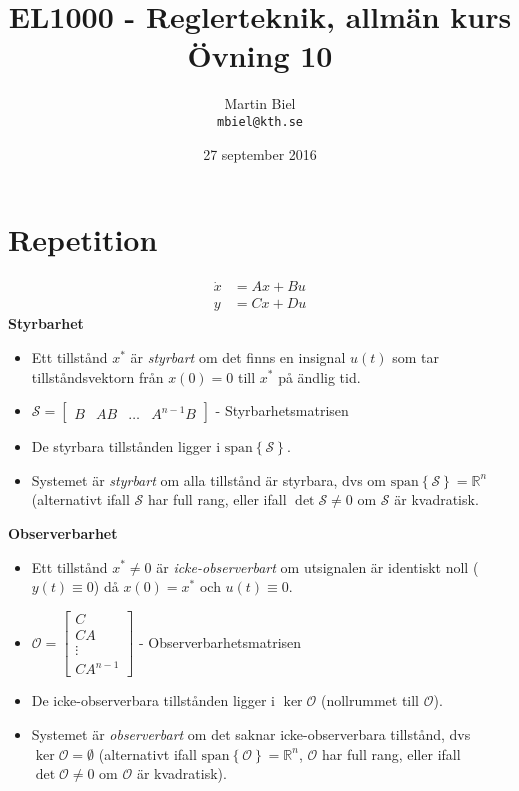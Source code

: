 \documentclass[12pt]{article}
\newcommand{\sspan}[1]{\mathrm{span}\left\{#1\right\}}
\begin{document}
\begin{titlepage}
\author{Martin Biel \\ \texttt{mbiel@kth.se}}
\title{EL1000 - Reglerteknik, allmän kurs \\ \Large Övning 10}
\date{27 september 2016}
\end{titlepage}

\maketitle

\section*{Repetition}
\begin{align*}
  \dot{x} &= Ax + Bu \\
  y &= Cx + Du
\end{align*}
\textbf{Styrbarhet} \\
\begin{itemize}
\item Ett tillstånd $x^*$ är \emph{styrbart} om det finns en insignal $u(t)$ som tar tillståndsvektorn från $x(0) = 0$ till $x^*$ på ändlig tid.
\item $\mathcal{S} =
  \begin{bmatrix}
    B & AB & \dots & A^{n-1}B
  \end{bmatrix}$ - Styrbarhetsmatrisen
\item De styrbara tillstånden ligger i $\sspan{\mathcal{S}}$.
\item Systemet är \emph{styrbart} om alla tillstånd är styrbara, dvs om $\sspan{\mathcal{S}} = \mathbb{R}^n$ (alternativt ifall $\mathcal{S}$ har full rang, eller ifall $\det{\mathcal{S}} \neq 0$ om $\mathcal{S}$ är kvadratisk.
\end{itemize}
\textbf{Observerbarhet}
\begin{itemize}
\item Ett tillstånd $x^* \neq 0$ är \emph{icke-observerbart} om utsignalen är identiskt noll ($y(t) \equiv 0$) då $x(0) = x^*$ och $u(t) \equiv 0$.
\item $\mathcal{O} =
  \begin{bmatrix}
    C \\
    CA \\
    \vdots \\
    CA^{n-1}
  \end{bmatrix}$ - Observerbarhetsmatrisen
\item De icke-observerbara tillstånden ligger i $\ker{\mathcal{O}}$ (nollrummet till $\mathcal{O}$).
\item Systemet är \emph{observerbart} om det saknar icke-observerbara tillstånd, dvs $\ker{\mathcal{O}} = \emptyset$ (alternativt ifall $\sspan{\mathcal{O}} = \mathbb{R}^n$, $\mathcal{O}$ har full rang, eller ifall $\det{\mathcal{O}} \neq 0$ om $\mathcal{O}$ är kvadratisk).
\end{itemize}
\end{document}
